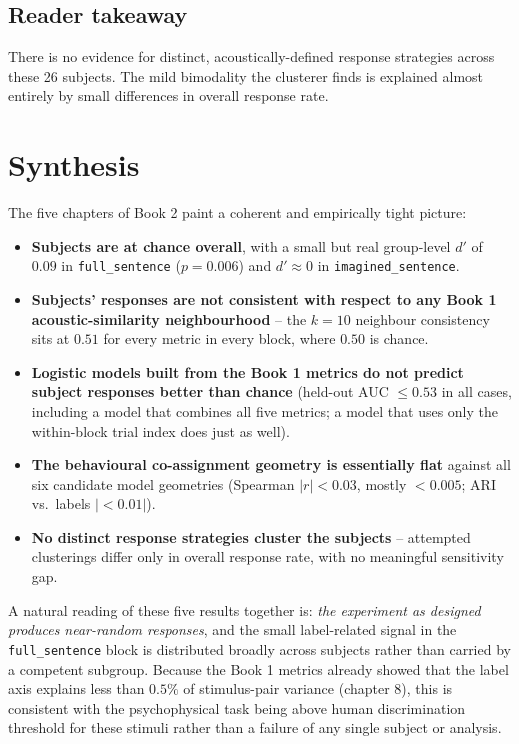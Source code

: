 \documentclass[11pt]{article}
\begin{document}
\subsection{Reader takeaway}

There is no evidence for distinct, acoustically-defined response strategies
across these 26 subjects. The mild bimodality the clusterer finds is
explained almost entirely by small differences in overall response rate.

\section{Synthesis}

The five chapters of Book 2 paint a coherent and empirically tight picture:

\begin{itemize}
\item \textbf{Subjects are at chance overall}, with a small but real
      group-level $d'$ of $0.09$ in \texttt{full\_sentence}
      ($p=0.006$) and $d'\approx 0$ in \texttt{imagined\_sentence}.
\item \textbf{Subjects' responses are not consistent with respect to any
      Book 1 acoustic-similarity neighbourhood} -- the $k=10$ neighbour
      consistency sits at $0.51$ for every metric in every block, where
      $0.50$ is chance.
\item \textbf{Logistic models built from the Book 1 metrics do not predict
      subject responses better than chance} (held-out AUC $\le 0.53$ in all
      cases, including a model that combines all five metrics; a model that
      uses only the within-block trial index does just as well).
\item \textbf{The behavioural co-assignment geometry is essentially flat}
      against all six candidate model geometries (Spearman $|r|<0.03$, mostly
      $<0.005$; ARI vs.\ labels $|<0.01|$).
\item \textbf{No distinct response strategies cluster the subjects} --
      attempted clusterings differ only in overall response rate, with no
      meaningful sensitivity gap.
\end{itemize}

A natural reading of these five results together is: \emph{the experiment as
designed produces near-random responses}, and the small label-related
signal in the \texttt{full\_sentence} block is distributed broadly across
subjects rather than carried by a competent subgroup. Because the Book 1
metrics already showed that the label axis explains less than $0.5\%$ of
stimulus-pair variance (chapter 8), this is consistent with the
psychophysical task being above human discrimination threshold for these
stimuli rather than a failure of any single subject or analysis.
\end{document}

